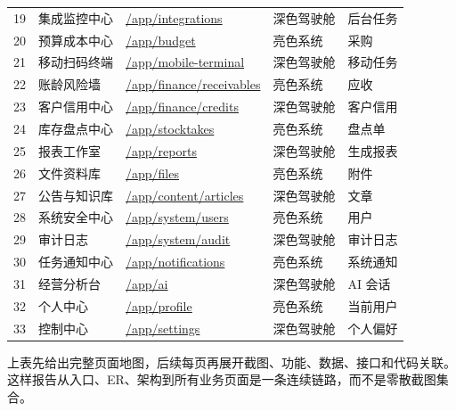 \documentclass[UTF8,zihao=-4]{ctexart}
\newcommand{\code}[1]{{\small\url{#1}}}
\begin{document}
\begin{longtable}{p{}p{}p{}p{}p{}}
19 & 集成监控中心 & \code{/app/integrations} & 深色驾驶舱 & 后台任务 \\
20 & 预算成本中心 & \code{/app/budget} & 亮色系统 & 采购 \\
21 & 移动扫码终端 & \code{/app/mobile-terminal} & 深色驾驶舱 & 移动任务 \\
22 & 账龄风险墙 & \code{/app/finance/receivables} & 亮色系统 & 应收 \\
23 & 客户信用中心 & \code{/app/finance/credits} & 深色驾驶舱 & 客户信用 \\
24 & 库存盘点中心 & \code{/app/stocktakes} & 亮色系统 & 盘点单 \\
25 & 报表工作室 & \code{/app/reports} & 深色驾驶舱 & 生成报表 \\
26 & 文件资料库 & \code{/app/files} & 亮色系统 & 附件 \\
27 & 公告与知识库 & \code{/app/content/articles} & 深色驾驶舱 & 文章 \\
28 & 系统安全中心 & \code{/app/system/users} & 亮色系统 & 用户 \\
29 & 审计日志 & \code{/app/system/audit} & 深色驾驶舱 & 审计日志 \\
30 & 任务通知中心 & \code{/app/notifications} & 亮色系统 & 系统通知 \\
31 & 经营分析台 & \code{/app/ai} & 深色驾驶舱 & AI 会话 \\
32 & 个人中心 & \code{/app/profile} & 亮色系统 & 当前用户 \\
33 & 控制中心 & \code{/app/settings} & 深色驾驶舱 & 个人偏好 \\
\bottomrule
\end{longtable}

上表先给出完整页面地图，后续每页再展开截图、功能、数据、接口和代码关联。这样报告从入口、ER、架构到所有业务页面是一条连续链路，而不是零散截图集合。
\clearpage
\end{document}
